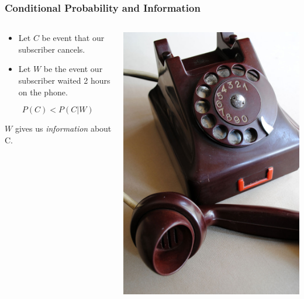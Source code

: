 \documentclass[12pt, block=fill]{beamer}
\begin{document}
\begin{frame}[t]
  \frametitle{Conditional Probability and Information}
  

    \begin{columns}
\begin{column}{0.65\textwidth}
\begin{itemize}
\item   Let $C$ be event that our subscriber cancels.
  \item Let $W$ be the event our subscriber waited 2 hours on the phone.
\end{itemize}


 $$ P(C) < P(C | W) $$ 
 
 $W$ gives us \textit{information} about C. 
 \end{column}
\begin{column}{0.35\textwidth}  %
    \begin{center}
     \includegraphics[width=\textwidth]{figures/phone}
     \end{center}
\end{column}
\end{columns}

\end{frame}
\end{document}
